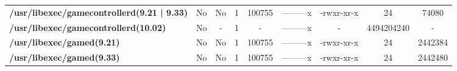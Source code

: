 \begin{center}
{\begin{tabular}{|>{\bfseries} l | C | C | C | C | C | C | C | C |}
					/usr/libexec/gamecontrollerd(9.21 | 9.33) & No & No & \color{green}1 & \color{red}100755 & \color{green}---------x & \color{red}-rwxr-xr-x & \color{green}24 & \color{red}74080\\ 
					/usr/libexec/gamecontrollerd(10.02) & No & - & 1 & - & ---------x & - & 4494204240 & -\\ 
					/usr/libexec/gamed(9.21) & No & No & \color{green}1 & \color{red}100755 & \color{green}---------x & \color{red}-rwxr-xr-x & \color{green}24 & \color{red}2442384\\ 
					/usr/libexec/gamed(9.33) & No & No & \color{green}1 & \color{red}100755 & \color{green}---------x & \color{red}-rwxr-xr-x & \color{green}24 & \color{red}2442480\\ 

			\end{tabular}
		}
	\end{center}



